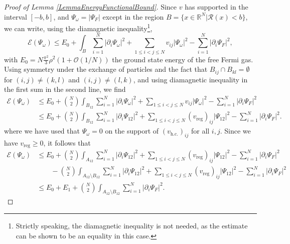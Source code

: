 \documentclass[a4paper,11pt]{article}
\newcommand{\abs}[1]{\left\lvert #1 \right\rvert}
\newcommand{\R}{\mathbb{R}}
\newcommand{\rr}{\mathcal{R}}
\numberwithin{equation}{section}
\begin{document}
	\begin{proof}[Proof of Lemma \ref{LemmaEnergyFunctionalBound}]
		Since $ v $ has supported in the interval $[-b,b]$, and $ \Psi_\omega=\abs{\Psi_F} $ except in the region $ B=\{x\in\R^N \vert \rr(x)<b \} $, we can write, using the diamagnetic inequality\footnote{Strictly speaking, the diamagnetic inequality is not needed, as the estimate can be shown to be an equality in this case.},
		\begin{equation}
			\mathcal{E}(\Psi_\omega)\leq E_0+\int_B \sum_{i=1}^{N}\abs{\partial_i\Psi_\omega}^2+\sum_{1\leq i<j\leq N}v_{ij}\abs{\Psi_\omega}^2-\sum_{i=1}^{N}\abs{\partial_i\Psi_F}^2,
		\end{equation}
		with $ E_0=N\frac{\pi^2}{3}\rho^2(1+\mathcal{O}(1/N)) $ the ground state energy of the free Fermi gas. Using symmetry under the exchange of particles and the fact that $B_{ij}\cap B_{kl}=\emptyset$ for $(i,j)\neq (k,l)$ and $(i,j)\neq (l,k)$, and using diamagnetic inequality in the first sum in the second line, we find \begin{equation}
			\begin{aligned}
				\mathcal{E}(\Psi_\omega)&\leq E_0+\binom{N}{2}\int_{B_{12}} \sum_{i=1}^{N}\abs{\partial_i\Psi_\omega}^2+\sum_{1\leq i<j\leq N}v_{ij}\abs{\Psi_\omega}^2-\sum_{i=1}^{N}\abs{\partial_i\Psi_F}^2\\&
				\leq E_0+\binom{N}{2}\int_{B_{12}} \sum_{i=1}^{N}\abs{\partial_i\Psi_{12}}^2+\sum_{1\leq i<j\leq N}(v_{\text{reg}})_{ij}\abs{\Psi_{12}}^2-\sum_{i=1}^{N}\abs{\partial_i\Psi_F}^2.
			\end{aligned}
		\end{equation}
		where we have used that $ \Psi_\omega=0 $ on the support of $ (v_{\text{h.c.}})_{ij} $ for all $ i,j $. Since we have $ v_{\text{reg}}\geq0 $, it follows that
		\begin{equation}
			\begin{aligned}
				\mathcal{E}(\Psi_\omega)&\leq E_0+\binom{N}{2}\int_{A_{12}} \sum_{i=1}^{N}\abs{\partial_i\Psi_{12}}^2+\sum_{1\leq i<j\leq N}(v_{\text{reg}})_{ij}\abs{\Psi_{12}}^2-\sum_{i=1}^{N}\abs{\partial_i\Psi_F}^2\\&\qquad
				-\binom{N}{2}\int_{A_{12}\setminus B_{12}} \sum_{i=1}^{N}\abs{\partial_i\Psi_{12}}^2+\sum_{1\leq i<j\leq N}(v_{\text{reg}})_{ij}\abs{\Psi_{12}}^2-\sum_{i=1}^{N}\abs{\partial_i\Psi_F}^2\\&
				\leq E_0+E_1+\binom{N}{2}\int_{A_{12}\setminus B_{12}}\sum_{i=1}^{N}\abs{\partial_i\Psi_F}^2.
			\end{aligned}

\end{equation}
\end{proof}
\end{document}
